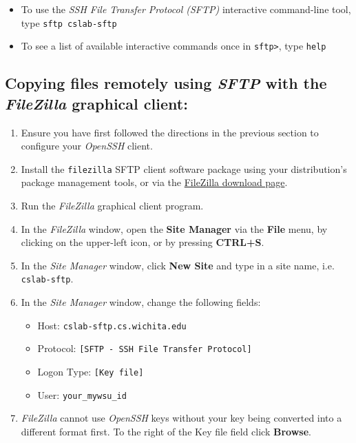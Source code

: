 \documentclass[12pt]{article}
\begin{document}
\begin{flushleft}
\begin{itemize}
  \item To use the \textit{SSH File Transfer Protocol (SFTP)} interactive command-line tool, type \break
  \verb|sftp cslab-sftp|  
\item To see a list of available interactive commands once in \verb|sftp>|, type \verb|help|
\end{itemize}

\subsection*{Copying files remotely using \textit{SFTP} with the \textit{FileZilla} graphical client:}
\begin{enumerate}
  \item Ensure you have first followed the directions in the previous section to configure your \textit{OpenSSH} client.
  \item Install the \texttt{filezilla} SFTP client software package using your distribution's package management tools, or via the \href{https://filezilla-project.org/download.php}{FileZilla download page}.
  \item Run the \textit{FileZilla} graphical client program.
  \item In the \textit{FileZilla} window, open the \textbf{Site Manager} via the \textbf{File} menu, by clicking on the upper-left icon, or by pressing \textbf{CTRL+S}.
  \item In the \textit{Site Manager} window, click \textbf{New Site} and type in a site name, i.e. \verb|cslab-sftp|.
  \item In the \textit{Site Manager} window, change the following fields:
  \begin{itemize}
    \item Host: \verb|cslab-sftp.cs.wichita.edu|
    \item Protocol: \verb|[SFTP - SSH File Transfer Protocol]|
    \item Logon Type: \verb|[Key file]|
    \item User: \verb|your_mywsu_id|
  \end{itemize}
  \item \textit{FileZilla} cannot use \textit{OpenSSH} keys without your key being converted into a different format first. To the right of the Key file field click \textbf{Browse}.

\end{enumerate}
\end{flushleft}
\end{document}
